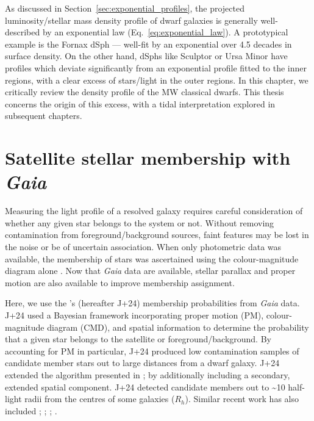 As discussed in Section~\ref{sec:exponential_profiles}, the projected
luminosity/stellar mass density profile of dwarf galaxies is generally
well-described by an exponential law (Eq.~\ref{eq:exponential_law}). A
prototypical example is the Fornax dSph --- well-fit by an exponential
over 4.5 decades in surface density. On the other hand, dSphs like
Sculptor or Ursa Minor have profiles which deviate significantly from an
exponential profile fitted to the inner regions, with a clear excess of
stars/light in the outer regions. In this chapter, we critically review
the density profile of the MW classical dwarfs. This thesis concerns the
origin of this excess, with a tidal interpretation explored in
subsequent chapters.

\section{\texorpdfstring{Satellite stellar membership with
\emph{Gaia}}{Satellite stellar membership with Gaia}}\label{satellite-stellar-membership-with-gaia}

Measuring the light profile of a resolved galaxy requires careful
consideration of whether any given star belongs to the system or not.
Without removing contamination from foreground/background sources, faint
features may be lost in the noise or be of uncertain association. When
only photometric data was available, the membership of stars was
ascertained using the colour-magnitude diagram alone \citep[e.g.,
matched filter methods like those used by][]{rockosi+2002}. Now that
\emph{Gaia} data are available, stellar parallax and proper motion are
also available to improve membership assignment.

Here, we use the \citet{jensen+2024}'s (hereafter J+24) membership
probabilities from \emph{Gaia} data. J+24 used a Bayesian framework
incorporating proper motion (PM), colour-magnitude diagram (CMD), and
spatial information to determine the probability that a given star
belongs to the satellite or foreground/background. By accounting for PM
in particular, J+24 produced low contamination samples of candidate
member stars out to large distances from a dwarf galaxy. J+24 extended
the algorithm presented in \citet{MV2020a}; \citet{MV2020b} by
additionally including a secondary, extended spatial component. J+24
detected candidate members out to \textasciitilde10 half-light radii
from the centres of some galaxies (\(R_h\)). Similar recent work has
also included \citet{pace+li2019}; \citet{battaglia+2022};
\citet{pace+erkal+li2022}; \citet{qi+2022}.

